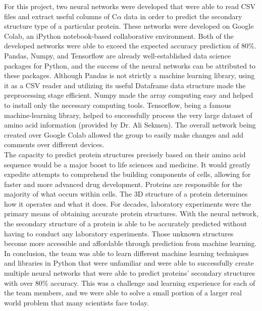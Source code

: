 \documentclass[12pt,letterpaper,oneside,reqno]{book}
\theoremstyle{plain}
\theoremstyle{definition}
\theoremstyle{plain}
\theoremstyle{remark}
\theoremstyle{plain}
\theoremstyle{definition}
\theoremstyle{plain}
\begin{document}
For this project, two neural networks were developed that were able to read CSV files and extract useful columns of C$\alpha$ data in order to predict the secondary structure type of a particular protein. These networks were developed on Google Colab, an iPython notebook-based collaborative environment. Both of the developed networks were able to exceed the expected accuracy prediction of 80\%. \\
\indent Pandas, Numpy, and Tensorflow are already well-established data science packages for Python, and the success of the neural networks can be attributed to these packages. Although Pandas is not strictly a machine learning library, using it as a CSV reader and utilizing its useful Dataframe data structure made the preprocessing stage efficient. Numpy made the array computing easy and helped to install only the necessary computing tools. Tensorflow, being a famous machine-learning library, helped to successfully process the very large dataset of amino acid information (provided by Dr. Ali Sekmen). The overall network being created over Google Colab allowed the group to easily make changes and add comments over different devices. \\
\indent The capacity to predict protein structures precisely based on their amino acid sequence would be a major boost to life sciences and medicine. It would greatly expedite attempts to comprehend the building components of cells, allowing for faster and more advanced drug development. Proteins are responsible for the majority of what occurs within cells. The 3D structure of a protein determines how it operates and what it does. For decades, laboratory experiments were the primary means of obtaining accurate protein structures. With the neural network, the secondary structure of a protein is able to be accurately predicted without having to conduct any laboratory experiments. Those unknown structures become more accessible and affordable through prediction from machine learning. \\
\indent In conclusion, the team was able to learn different machine learning techniques and libraries in Python that were unfamiliar and were able to successfully create multiple neural networks that were able to predict proteins' secondary structures with over 80\% accuracy. This was a challenge and learning experience for each of the team members, and we were able to solve a small portion of a larger real world problem that many scientists face today.
\end{document}
